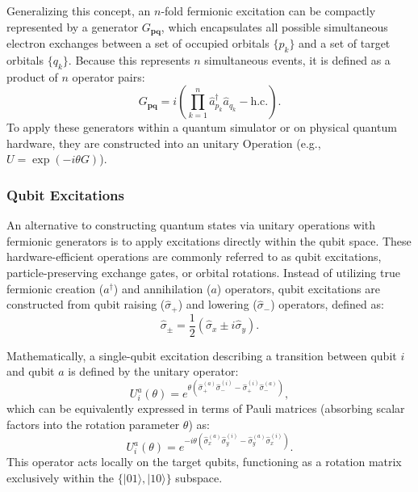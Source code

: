 Generalizing this concept, an $n$-fold fermionic excitation can be compactly represented by a generator $G_{\mathbf{pq}}$, which encapsulates all possible simultaneous electron exchanges between a set of occupied orbitals $\{p_k\}$ and a set of target orbitals $\{q_k\}$. Because this represents $n$ simultaneous events, it is defined as a product of $n$ operator pairs:
\begin{equation}
    \label{mult_fe_exc_generator}
    G_{\mathbf{pq}} = i \left( \prod_{k=1}^{n} \hat{a}^\dagger_{p_k} \hat{a}_{q_k} - \text{h.c.} \right).
\end{equation}
To apply these generators within a quantum simulator or on physical quantum hardware, they are constructed into an unitary Operation (e.g., $U = \exp(-i\theta G)$).

\cite[chapter II.]{kottmann2020feasible}
\cite[chapter III.A]{anand2022quantum}

\subsubsection{Qubit Excitations}

An alternative to constructing quantum states via unitary operations with fermionic generators is to apply excitations directly within the qubit space. These hardware-efficient operations are commonly referred to as qubit excitations, particle-preserving exchange gates, or orbital rotations. Instead of utilizing true fermionic creation ($a^\dagger$) and annihilation ($a$) operators, qubit excitations are constructed from qubit raising ($\hat{\sigma}_+$) and lowering ($\hat{\sigma}_-$) operators, defined as:
\begin{equation}
    \hat{\sigma}_\pm = \frac{1}{2}(\hat{\sigma}_x \pm i\hat{\sigma}_y).
\end{equation}

Mathematically, a single-qubit excitation describing a transition between qubit $i$ and qubit $a$ is defined by the unitary operator:
\begin{equation}
    U_{i}^{a}(\theta) = e^{\theta \left(\hat{\sigma}_+^{(a)}\hat{\sigma}_-^{(i)} - \hat{\sigma}_+^{(i)}\hat{\sigma}_-^{(a)}\right)},
\end{equation}
which can be equivalently expressed in terms of Pauli matrices (absorbing scalar factors into the rotation parameter $\theta$) as:
\begin{equation}
    U_{i}^{a}(\theta) = e^{-i\theta \left(\hat{\sigma}_x^{(a)}\hat{\sigma}_y^{(i)} - \hat{\sigma}_y^{(a)}\hat{\sigma}_x^{(i)}\right)}.
\end{equation}
This operator acts locally on the target qubits, functioning as a rotation matrix exclusively within the $\{|01\rangle, |10\rangle\}$ subspace.

